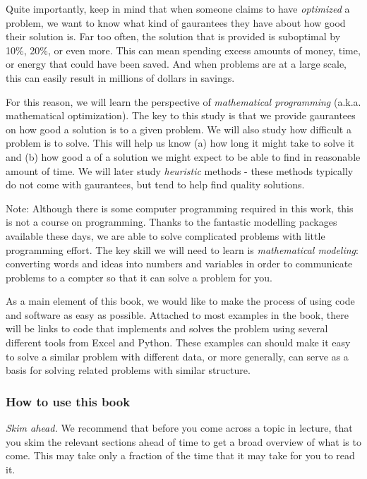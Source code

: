 \documentclass[letter,12pt]{book}
\renewcommand{\0}{\mathbf{0}}
\begin{document}
Quite importantly, keep in mind that when someone claims to have \emph{optimized} a problem, we want to know what kind of gaurantees they have about how good their solution is.  Far too often, the solution that is provided is suboptimal by 10\%, 20\%, or even more.  This can mean spending excess amounts of money, time, or energy that could have been saved. And when problems are at a large scale, this can easily result in millions of dollars in savings.

For this reason, we will learn the perspective of \emph{mathematical programming} (a.k.a. mathematical optimization).  The key to this study is that we provide gaurantees on how good a solution is to a given problem.  We will also study how difficult a problem is to solve.  This will help us know (a) how long it might take to solve it and (b) how good a of a solution we might expect to be able to find in reasonable amount of time. We will later study \emph{heuristic} methods - these methods typically do not come with gaurantees, but tend to help find quality solutions.

Note: Although there is some computer programming required in this work, this is not a course on programming.   Thanks to the fantastic modelling packages available these days, we are able to solve complicated problems with little programming effort.   The key skill we will need to learn is \emph{mathematical modeling}: converting words and ideas into numbers and variables in order to communicate problems to a compter so that it can solve a problem for you.  

As a main element of this book, we would like to make the process of using code and software as easy as possible.  Attached to most examples in the book, there will be links to code that implements and solves the problem using several different tools from Excel and Python.  These examples can should make it easy to solve a similar problem with different data, or more generally, can serve as a basis for solving related problems with similar structure.

\subsubsection*{How to use this book}

\emph{Skim ahead.} We recommend that before you come across a topic in lecture, that you skim the relevant sections ahead of time to get a broad overview of what is to come.   This may take only a fraction of the time that it may take for you to read it.
\end{document}
